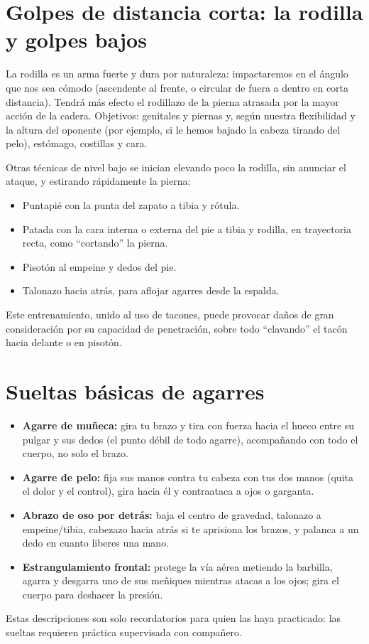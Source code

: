 \section{Golpes de distancia corta: la rodilla y golpes bajos}

La rodilla es un arma fuerte y dura por naturaleza: impactaremos en el ángulo que nos sea cómodo (ascendente al frente, o circular de fuera a dentro en corta distancia). Tendrá más efecto el rodillazo de la pierna atrasada por la mayor acción de la cadera. Objetivos: genitales y piernas y, según nuestra flexibilidad y la altura del oponente (por ejemplo, si le hemos bajado la cabeza tirando del pelo), estómago, costillas y cara.

Otras técnicas de nivel bajo se inician elevando poco la rodilla, sin anunciar el ataque, y estirando rápidamente la pierna:

\begin{itemize}
  \item Puntapié con la punta del zapato a tibia y rótula.
  \item Patada con la cara interna o externa del pie a tibia y rodilla, en trayectoria recta, como \enquote{cortando} la pierna.
  \item Pisotón al empeine y dedos del pie.
  \item Talonazo hacia atrás, para aflojar agarres desde la espalda.
\end{itemize}

Este entrenamiento, unido al uso de tacones, puede provocar daños de gran consideración por su capacidad de penetración, sobre todo \enquote{clavando} el tacón hacia delante o en pisotón.

\section{Sueltas básicas de agarres}

\begin{itemize}
  \item \textbf{Agarre de muñeca:} gira tu brazo y tira con fuerza hacia el hueco entre su pulgar y sus dedos (el punto débil de todo agarre), acompañando con todo el cuerpo, no solo el brazo.
  \item \textbf{Agarre de pelo:} fija sus manos contra tu cabeza con tus dos manos (quita el dolor y el control), gira hacia él y contraataca a ojos o garganta.
  \item \textbf{Abrazo de oso por detrás:} baja el centro de gravedad, talonazo a empeine/tibia, cabezazo hacia atrás si te aprisiona los brazos, y palanca a un dedo en cuanto liberes una mano.
  \item \textbf{Estrangulamiento frontal:} protege la vía aérea metiendo la barbilla, agarra y desgarra uno de sus meñiques mientras atacas a los ojos; gira el cuerpo para deshacer la presión.
\end{itemize}

\begin{aviso}
Estas descripciones son solo recordatorios para quien las haya practicado: las sueltas requieren práctica supervisada con compañero.
\end{aviso}
